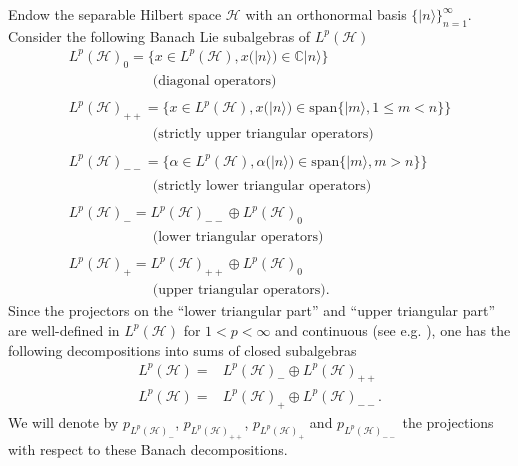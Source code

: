 \documentclass[a4paper,12pt,reqno]{amsart}%
\theoremstyle{definition}
\theoremstyle{remark}
\numberwithin{theorem}{section}
\numberwithin{equation}{section}
\newcommand{\1}{{\bf 1}}
\newcommand\C{{\mathbb{C}}}
\begin{document}
Endow the separable Hilbert space $\mathcal{H}$ with an orthonormal basis $\{|n\rangle\}_{n=1}^{\infty}$. Consider the following Banach Lie subalgebras of $L^p(\mathcal{H})$
\[
\begin{array}{l}
L^p(\mathcal{H})_{0} = \{x \in L^p(\mathcal{H}), x(|n\rangle) \in \C|n\rangle\}\\   \quad \quad\quad \quad\quad \quad \textrm{(diagonal operators)}\\ \\ 
L^p(\mathcal{H})_{++} = \{x \in L^p(\mathcal{H}), x(|n\rangle) \in \textrm{span}\{|m\rangle, 1\leq m< n\}\}\\  \quad \quad \quad \quad\quad\quad  \textrm{(strictly upper triangular operators)}\\ \\
L^{p}(\mathcal{H})_{--} = \{\alpha\in L^{p}(\mathcal{H}), \alpha(|n\rangle) \in \textrm{span}\{|m\rangle, m>n\}\}\\  \quad \quad \quad \quad\quad  \quad\textrm{(strictly lower triangular operators)}\\ \\
L^p(\mathcal{H})_{-} = L^p(\mathcal{H})_{--} \oplus L^p(\mathcal{H})_{0}\\   \quad \quad\quad \quad\quad \quad \textrm{(lower triangular operators)}\\ \\ 
L^{p}(\mathcal{H})_{+} = L^p(\mathcal{H})_{++} \oplus L^p(\mathcal{H})_{0}\\  \quad \quad \quad \quad\quad\quad\textrm{(upper triangular operators)}.
\end{array}
\]
Since the projectors on the ``lower triangular part'' and ``upper triangular part'' are well-defined in $L^p(\mathcal{H})$ for $1<p<\infty$ and continuous (see e.g. \cite[Ch.~III, Theorem~6.2]{gohberg70}),
one has the following decompositions into sums of closed subalgebras
\begin{align}\label{Lp}
L^p(\mathcal{H}) =& L^p(\mathcal{H})_{-} \oplus L^p(\mathcal{H})_{++}\\
L^p(\mathcal{H}) =& L^p(\mathcal{H})_{+}\oplus L^p(\mathcal{H})_{--}.
\end{align} 
We will denote by $p_{L^p(\mathcal{H})_{-}}$, $p_{L^p(\mathcal{H})_{++}}$, $p_{L^{p}(\mathcal{H})_{+}}$ and $p_{L^{p}(\mathcal{H})_{--} }$ the projections with respect to these Banach decompositions. 
\end{document}
